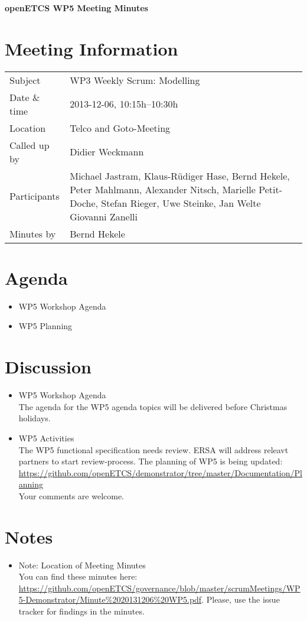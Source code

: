 \documentclass[a4paper, 11pt]{article}
\begin{document}
{\begin{center}\huge\bf openETCS WP5 Meeting Minutes\end{center}}
\section{Meeting Information}

\renewcommand{\arraystretch}{1.5}
\begin{supertabular}{m{.2\textwidth}m{.8\textwidth}}
Subject & WP3 Weekly Scrum: Modelling\\
Date \& time & 2013-12-06, 10:15h--10:30h\\
Location & Telco and Goto-Meeting\\
Called up by & Didier Weckmann\\
Participants &
Michael Jastram,
Klaus-R\"udiger Hase,
Bernd Hekele,
Peter Mahlmann,
Alexander Nitsch,
Marielle Petit-Doche,
Stefan Rieger,
Uwe Steinke,
Jan Welte
Giovanni Zanelli
\\

Minutes by & Bernd Hekele\\
\end{supertabular}
\renewcommand{\arraystretch}{1.0}


\section{{Agenda}}
\begin{itemize}
\item WP5 Workshop Agenda
\item WP5 Planning
\end{itemize}

\section{Discussion}
\begin{itemize}
\item WP5 Workshop Agenda\\
The agenda for the WP5 agenda topics will be delivered before Christmas holidays.

\item WP5 Activities\\
The WP5 functional specification needs review. ERSA will address releavt partners to start review-process. The planning of WP5 is being updated: \url{https://github.com/openETCS/demonstrator/tree/master/Documentation/Planning}\\
Your comments are welcome.

\end{itemize}

\section{Notes}

\begin{itemize}
\item Note: Location of Meeting Minutes\\
You can find these minutes here: \url{https://github.com/openETCS/governance/blob/master/scrumMeetings/WP5-Demonstrator/Minute%2020131206%20WP5.pdf}. Please, use the issue tracker for findings in the minutes.

\end{itemize}
\end{document}
